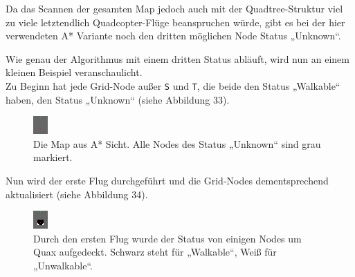 \documentclass[a4paper,12pt]{article}
\newcommand{\code}{\texttt}
\begin{document}
Da das Scannen der gesamten Map jedoch auch mit der Quadtree-Struktur viel zu viele letztendlich Quadcopter-Flüge beanspruchen würde, gibt es bei der hier verwendeten A* Variante noch den dritten möglichen Node Status „Unknown“.

Wie genau der Algorithmus mit einem dritten Status abläuft, wird nun an einem kleinen Beispiel veranschaulicht.
\\[0.4cm]
Zu Beginn hat jede Grid-Node außer \code{S} und \code{T}, die beide den Status „Walkable“ haben, den Status „Unknown“ (siehe Abbildung 33). 
\begin{figure}[H]
\centering
    \includegraphics[width=.5\linewidth]{Bilder/Aufgabe3/Teilaufgabe_A/Beispiel_01.png}
    \caption{Die Map aus A* Sicht. Alle Nodes des Status „Unknown“ sind grau markiert.}
\end{figure}
Nun wird der erste Flug durchgeführt und die Grid-Nodes dementsprechend aktualisiert (siehe Abbildung 34).
\begin{figure}[H]
\centering
    \includegraphics[width=.5\linewidth]{Bilder/Aufgabe3/Teilaufgabe_A/Beispiel_02.png}
    \caption{Durch den ersten Flug wurde der Status von einigen Nodes um Quax aufgedeckt. Schwarz steht für „Walkable“, Weiß für „Unwalkable“.}
\end{figure}
\end{document}
